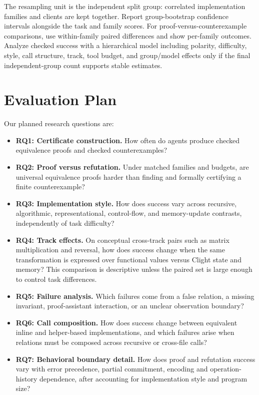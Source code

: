 \documentclass{article}
\begin{document}
The resampling unit is the independent split group: correlated implementation families and clients are kept together. Report group-bootstrap confidence intervals alongside the task and family scores. For proof-versus-counterexample comparisons, use within-family paired differences and show per-family outcomes. Analyze checked success with a hierarchical model including polarity, difficulty, style, call structure, track, tool budget, and group/model effects only if the final independent-group count supports stable estimates.

\section{Evaluation Plan}

Our planned research questions are:
\begin{itemize}
  \item \textbf{RQ1: Certificate construction.} How often do agents produce checked equivalence proofs and checked counterexamples?
  \item \textbf{RQ2: Proof versus refutation.} Under matched families and budgets, are universal equivalence proofs harder than finding and formally certifying a finite counterexample?
  \item \textbf{RQ3: Implementation style.} How does success vary across recursive, algorithmic, representational, control-flow, and memory-update contrasts, independently of task difficulty?
  \item \textbf{RQ4: Track effects.} On conceptual cross-track pairs such as matrix multiplication and reversal, how does success change when the same transformation is expressed over functional values versus Clight state and memory? This comparison is descriptive unless the paired set is large enough to control task differences.
  \item \textbf{RQ5: Failure analysis.} Which failures come from a false relation, a missing invariant, proof-assistant interaction, or an unclear observation boundary?
  \item \textbf{RQ6: Call composition.} How does success change between equivalent inline and helper-based implementations, and which failures arise when relations must be composed across recursive or cross-file calls?
  \item \textbf{RQ7: Behavioral boundary detail.} How does proof and refutation success vary with error precedence, partial commitment, encoding and operation-history dependence, after accounting for implementation style and program size?
\end{itemize}
\end{document}
